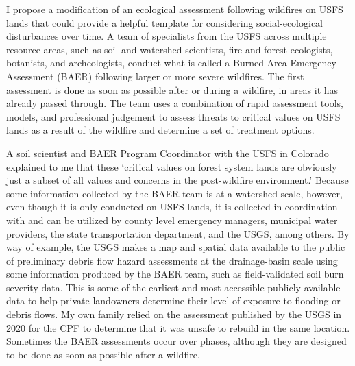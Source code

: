 \documentclass[
]{article}
\begin{document}
I propose a modification of an ecological assessment following wildfires on USFS lands that could provide a helpful template for considering social-ecological disturbances over time. A team of specialists from the USFS across multiple resource areas, such as soil and watershed scientists, fire and forest ecologists, botanists, and archeologists, conduct what is called a Burned Area Emergency Assessment (BAER) following larger or more severe wildfires. The first assessment is done as soon as possible after or during a wildfire, in areas it has already passed through. The team uses a combination of rapid assessment tools, models, and professional judgement to assess threats to critical values on USFS lands as a result of the wildfire and determine a set of treatment options.

A soil scientist and BAER Program Coordinator with the USFS in Colorado explained to me that these `critical values on forest system lands are obviously just a subset of all values and concerns in the post-wildfire environment.' Because some information collected by the BAER team is at a watershed scale, however, even though it is only conducted on USFS lands, it is collected in coordination with and can be utilized by county level emergency managers, municipal water providers, the state transportation department, and the USGS, among others. By way of example, the USGS makes a map and spatial data available to the public of preliminary debris flow hazard assessments at the drainage-basin scale using some information produced by the BAER team, such as field-validated soil burn severity data. This is some of the earliest and most accessible publicly available data to help private landowners determine their level of exposure to flooding or debris flows. My own family relied on the assessment published by the USGS in 2020 for the CPF to determine that it was unsafe to rebuild in the same location. Sometimes the BAER assessments occur over phases, although they are designed to be done as soon as possible after a wildfire.
\end{document}
